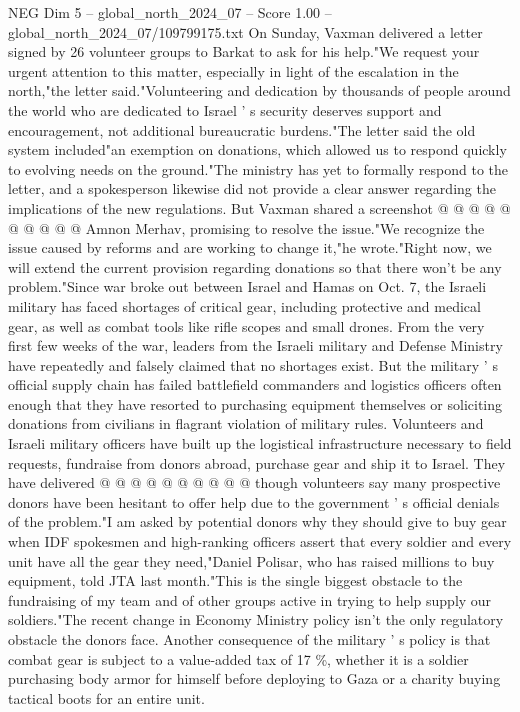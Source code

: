\begin{textsample}{NEG Dim 5 – global\_north\_2024\_07 – Score 1.00 – global\_north\_2024\_07/109799175.txt}
On Sunday, Vaxman delivered a letter signed by 26 volunteer groups to Barkat to ask for his help."We request your urgent attention to this matter, especially in light of the escalation in the north,"the letter said."Volunteering and dedication by thousands of people around the world who are dedicated to Israel ' s security deserves support and encouragement, not additional bureaucratic burdens."The letter said the old system included"an exemption on donations, which allowed us to respond quickly to evolving needs on the ground."The ministry has yet to formally respond to the letter, and a spokesperson likewise did not provide a clear answer regarding the implications of the new regulations.
But Vaxman shared a screenshot @ @ @ @ @ @ @ @ @ @ Amnon Merhav, promising to resolve the issue."We recognize the issue caused by reforms and are working to change it,"he wrote."Right now, we will extend the current provision regarding donations so that there won't be any problem."Since war broke out between Israel and Hamas on Oct. 7, the Israeli military has faced shortages of critical gear, including protective and medical gear, as well as combat tools like rifle scopes and small drones.
From the very first few weeks of the war, leaders from the Israeli military and Defense Ministry have repeatedly and falsely claimed that no shortages exist.
But the military ' s official supply chain has failed battlefield commanders and logistics officers often enough that they have resorted to purchasing equipment themselves or soliciting donations from civilians in flagrant violation of military rules.
Volunteers and Israeli military officers have built up the logistical infrastructure necessary to field requests, fundraise from donors abroad, purchase gear and ship it to Israel.
They have delivered @ @ @ @ @ @ @ @ @ @ though volunteers say many prospective donors have been hesitant to offer help due to the government ' s official denials of the problem."I am asked by potential donors why they should give to buy gear when IDF spokesmen and high-ranking officers assert that every soldier and every unit have all the gear they need,"Daniel Polisar, who has raised millions to buy equipment, told JTA last month."This is the single biggest obstacle to the fundraising of my team and of other groups active in trying to help supply our soldiers."The recent change in Economy Ministry policy isn't the only regulatory obstacle the donors face.
Another consequence of the military ' s policy is that combat gear is subject to a value-added tax of 17 \%, whether it is a soldier purchasing body armor for himself before deploying to Gaza or a charity buying tactical boots for an entire unit.

\end{textsample}

